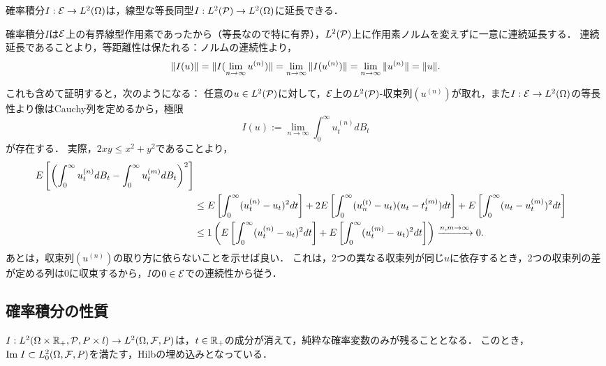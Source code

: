 \documentclass[uplatex,dvipdfmx]{jsreport}
\begin{document}
\begin{corollary}[確率積分の等距離延長]\label{cor-extention-of-SI}
    確率積分$I:\E\to L^2(\Om)$は，線型な等長同型$I:L^2(\P)\to L^2(\Om)$に延長できる．
\end{corollary}
\begin{Proof}
    確率積分$I$は$\E$上の有界線型作用素であったから（等長なので特に有界），$L^2(\P)$上に作用素ノルムを変えずに一意に連続延長する．
    連続延長であることより，等距離性は保たれる：ノルムの連続性より，
    \[\norm{I(u)}=\norm{I(\lim_{n\to\infty}u^{(n)})}=\lim_{n\to\infty}\norm{I(u^{(n)})}=\lim_{n\to\infty}\norm{u^{(n)}}=\norm{u}.\]

    これも含めて証明すると，次のようになる：
    任意の$u\in L^2(\P)$に対して，$\E$上の$L^2(\P)$-収束列$(u^{(n)})$が取れ，また$I:\E\to L^2(\Om)$の等長性より像はCauchy列を定めるから，極限
    \[I(u):=\lim_{n\to\infty}\int^\infty_0u_t^{(n)}dB_t\]
    が存在する．
    実際，$2xy\le x^2+y^2$であることより，
    \begin{align*}
        E\Square{\paren{\int^\infty_0u_t^{(n)}dB_t-\int^\infty_0u_t^{(m)}dB_t}^2}\\
        &\le E\Square{\int^\infty_0(u_t^{(n)}-u_t)^2dt}+2E\Square{\int^\infty_0(u_n^{(t)}-u_t)(u_t-t_t^{(m)})dt}+E\Square{\int^\infty_0(u_t-u_t^{(m)})^2dt}\\
        &\le 1\paren{E\Square{\int^\infty_0(u_t^{(n)}-u_t)^2dt}+E\Square{\int^\infty_0(u_t^{(m)}-u_t)^2dt}}\xrightarrow{n,m\to\infty}0.
    \end{align*}
    あとは，収束列$(u^{(n)})$の取り方に依らないことを示せば良い．
    これは，2つの異なる収束列が同じ$u$に依存するとき，2つの収束列の差が定める列は$0$に収束するから，$I$の$0\in\E$での連続性から従う．
\end{Proof}

\subsection{確率積分の性質}

\begin{tcolorbox}[colframe=ForestGreen, colback=ForestGreen!10!white,breakable,colbacktitle=ForestGreen!40!white,coltitle=black,fonttitle=\bfseries\sffamily,
title=]
    $I:L^2(\Om\times\R_+,\P,P\times l)\to L^2(\Om,\F,P)$は，$t\in\R_+$の成分が消えて，純粋な確率変数のみが残ることとなる．
    このとき，$\Im I\subset L^2_0(\Om,\F,P)$を満たす，Hilbの埋め込みとなっている．
\end{tcolorbox}
\end{document}

